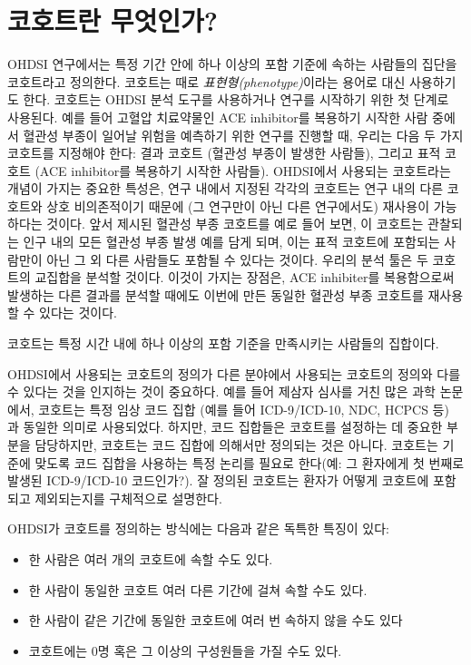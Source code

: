 \documentclass[11pt]{book}
\providecommand{\tightlist}{%
  \setlength{\itemsep}{0pt}\setlength{\parskip}{0pt}}
\theoremstyle{definition}
\theoremstyle{definition}
\theoremstyle{definition}
\theoremstyle{remark}
\let\BeginKnitrBlock\begin \let\EndKnitrBlock\end
\begin{document}
\section{코호트란 무엇인가?}\label{-}

OHDSI 연구에서는 특정 기간 안에 하나 이상의 포함 기준에 속하는 사람들의
집단을 코호트라고 정의한다. 코호트는 때로 \emph{표현형(phenotype)}이라는
용어로 대신 사용하기도 한다. 코호트는 OHDSI 분석 도구를 사용하거나
연구를 시작하기 위한 첫 단계로 사용된다. 예를 들어 고혈압 치료약물인 ACE
inhibitor를 복용하기 시작한 사람 중에서 혈관성 부종이 일어날 위험을
예측하기 위한 연구를 진행할 때, 우리는 다음 두 가지 코호트를 지정해야
한다: 결과 코호트 (혈관성 부종이 발생한 사람들), 그리고 표적 코호트 (ACE
inhibitor를 복용하기 시작한 사람들). OHDSI에서 사용되는 코호트라는
개념이 가지는 중요한 특성은, 연구 내에서 지정된 각각의 코호트는 연구
내의 다른 코호트와 상호 비의존적이기 때문에 (그 연구만이 아닌 다른
연구에서도) 재사용이 가능하다는 것이다. 앞서 제시된 혈관성 부종 코호트를
예로 들어 보면, 이 코호트는 관찰되는 인구 내의 모든 혈관성 부종 발생
예를 담게 되며, 이는 표적 코호트에 포함되는 사람만이 아닌 그 외 다른
사람들도 포함될 수 있다는 것이다. 우리의 분석 툴은 두 코호트의 교집합을
분석할 것이다. 이것이 가지는 장점은, ACE inhibiter를 복용함으로써
발생하는 다른 결과를 분석할 때에도 이번에 만든 동일한 혈관성 부종
코호트를 재사용할 수 있다는 것이다.

\BeginKnitrBlock{rmdimportant}
코호트는 특정 시간 내에 하나 이상의 포함 기준을 만족시키는 사람들의
집합이다.
\EndKnitrBlock{rmdimportant}

  OHDSI에서 사용되는 코호트의
정의가 다른 분야에서 사용되는 코호트의 정의와 다를 수 있다는 것을
인지하는 것이 중요하다. 예를 들어 제삼자 심사를 거친 많은 과학 논문에서,
코호트는 특정 임상 코드 집합 (예를 들어 ICD-9/ICD-10, NDC, HCPCS 등) 과
동일한 의미로 사용되었다. 하지만, 코드 집합들은 코호트를 설정하는 데
중요한 부분을 담당하지만, 코호트는 코드 집합에 의해서만 정의되는 것은
아니다. 코호트는 기준에 맞도록 코드 집합을 사용하는 특정 논리를 필요로
한다(예: 그 환자에게 첫 번째로 발생된 ICD-9/ICD-10 코드인가?). 잘 정의된
코호트는 환자가 어떻게 코호트에 포함되고 제외되는지를 구체적으로
설명한다. 

 OHDSI가 코호트를 정의하는 방식에는 다음과 같은 독특한
특징이 있다:

\begin{itemize}
\tightlist
\item
  한 사람은 여러 개의 코호트에 속할 수도 있다.
\item
  한 사람이 동일한 코호트 여러 다른 기간에 걸쳐 속할 수도 있다.
\item
  한 사람이 같은 기간에 동일한 코호트에 여러 번 속하지 않을 수도 있다
\item
  코호트에는 0명 혹은 그 이상의 구성원들을 가질 수도 있다.
\end{itemize}
\end{document}
